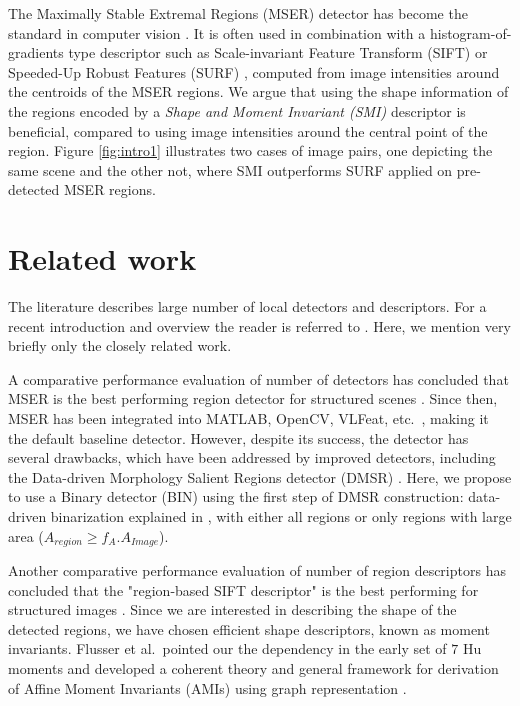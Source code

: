 \documentclass[a4paper,11pt]{article}
\begin{document}
The Maximally Stable Extremal Regions (MSER) detector has become the standard in computer vision \cite{ Matas2002BMVC}. It is often used in combination with a histogram-of-gradients type descriptor such as Scale-invariant Feature Transform (SIFT) or Speeded-Up Robust Features (SURF) \cite{Bay2008}, computed from image intensities around the centroids of the MSER regions. We argue that using the shape information of the regions encoded by a {\em Shape and Moment Invariant (SMI)} descriptor is beneficial, compared to using image intensities around the central point of the region. Figure \ref{fig:intro1} illustrates two cases of image pairs, one depicting the same scene and the other not, where SMI outperforms SURF applied on pre-detected MSER regions.

\section{Related work}
The literature describes large number of local detectors and descriptors. For a recent introduction and overview the reader is referred to \cite{Hassaballah:2016}. Here, we mention very briefly only the closely related work.

A comparative performance evaluation of number of detectors has concluded that MSER is the best performing region detector for structured scenes \cite{Mikolajczyk:2005}. Since then, MSER has been integrated into MATLAB, OpenCV, VLFeat, etc.~, making it the default baseline detector. However, despite its success, the detector has several drawbacks, which have been addressed by improved detectors, including the Data-driven Morphology Salient Regions detector (DMSR) \cite{Ranguelova2016AICCSA}. Here, we propose to use a Binary detector (BIN) using the first step of DMSR construction: data-driven binarization explained in \cite{Ranguelova2016AICCSA}, with either all regions or only regions with large area ($A_{region} \ge f_A.A_{Image}$).

Another comparative performance evaluation of number of region descriptors has concluded that the "region-based SIFT descriptor" is the best performing for structured images \cite{Mikolajczyk:descr:2005}. Since we are interested in describing the shape of the detected regions, we have chosen efficient shape descriptors, known as moment invariants. Flusser et al.~pointed our the dependency in the early set of $7$ Hu moments and developed a coherent theory and general framework for derivation of Affine Moment Invariants (AMIs) using graph representation \cite{SukF04, Flusser09a}.
\end{document}
